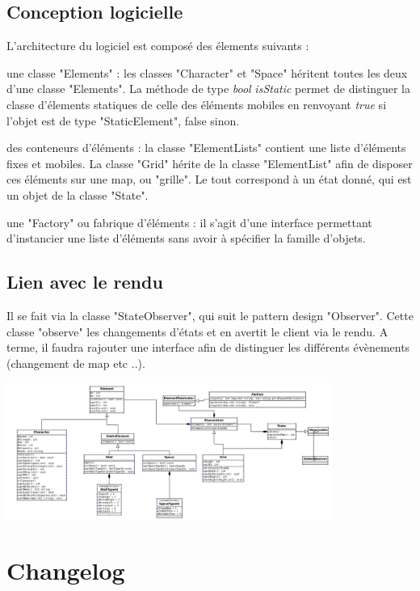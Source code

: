 \documentclass[12pt,a4paper]{report}
\begin{document}
    	\section{Conception logicielle}
	L'architecture du logiciel est composé des élements suivants :
	\item une classe "Elements" : les classes "Character" et "Space" héritent toutes les deux d'une classe "Elements". La méthode de type \textit{bool} \textit{isStatic} permet de distinguer la classe d'élements statiques de celle des éléments mobiles en renvoyant \textit{true} si l'objet est de type "StaticElement", false sinon.
	\item des conteneurs d'éléments : la classe "ElementLists" contient une liste d'éléments fixes et mobiles. La classe "Grid" hérite de la classe "ElementList" afin de disposer ces éléments sur une map, ou "grille". Le tout correspond à un état donné, qui est un objet de la classe "State".
	\item une "Factory" ou fabrique d'éléments : il s'agit d'une interface permettant d'instancier une liste d'éléments sans avoir à spécifier la famille d'objets.
    
	\section{Lien avec le rendu}
	Il se fait via la classe "StateObserver", qui suit le pattern design "Observer". Cette classe "observe" les changements d'états et en avertit le client via le rendu. A terme, il faudra rajouter une interface afin de distinguer les différents évènements (changement de map etc ..).    

\includegraphics[width=0.80\textwidth]{dia.png}

    \chapter{Changelog}
\end{document}
